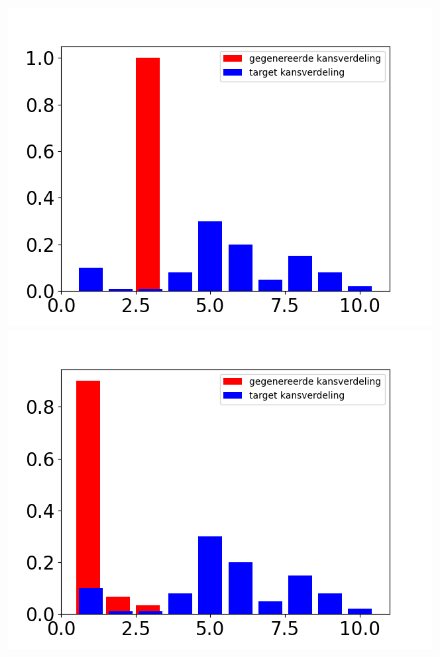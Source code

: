\begin{figure}
    \centering
    \begin{minipage}{0.49\linewidth}
        \includegraphics[width=\linewidth]{Figures/goede_visualisatie_3/visualisatie_1.png} 
    \end{minipage}
    \hfill
    \begin{minipage}{0.49\linewidth}
        \includegraphics[width=\linewidth]{Figures/goede_visualisatie_3/visualisatie_90.png}
    \end{minipage}
    \begin{minipage}{0.49\linewidth}

\end{minipage}
\end{figure}
